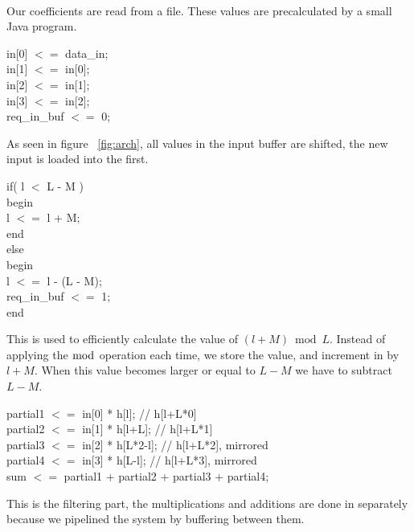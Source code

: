 \\
Our coefficients are read from a file. These values are precalculated by a small Java program.\\
\begin{center}
\parbox{10cm}{
in[0] $<=$ data\_in;\\
in[1] $<=$ in[0];\\
in[2] $<=$ in[1];\\
in[3] $<=$ in[2];\\
req\_in\_buf $<=$ 0;\\
}
\end{center}
As seen in figure ~\ref{fig:arch}, all values in the input buffer are shifted, the new input is loaded into the first.\\
\begin{center}
\parbox{10cm}{
if( l $<$ L - M )\\
begin\\
\phantom{xxxx} l $<=$ l + M;\\
end\\
else\\
begin\\
\phantom{xxxx}l $<=$ l - (L - M);\\
\phantom{xxxx}req\_in\_buf $<=$ 1;\\
end\\
}
\end{center}
This is used to efficiently calculate the value of $(l + M) \bmod L$. Instead of applying the $\bmod$ operation each time, we store the value, and increment in by $l + M$. When this value becomes larger or equal to  $L - M$ we have to subtract $L - M$.\\
\begin{center}
\parbox{10cm}{
partial1 $<=$ in[0] * h[l];      // h[l+L*0] \\
partial2 $<=$ in[1] * h[l+L];    // h[l+L*1]\\
partial3 $<=$ in[2] * h[L*2-l];  // h[l+L*2], mirrored\\
partial4 $<=$ in[3] * h[L-l];    // h[l+L*3], mirrored\\
sum $<=$ partial1 + partial2 + partial3 + partial4;\\
}
\end{center}
This is the filtering part, the multiplications and additions are done in separately because we pipelined the system by buffering between them.

\centerline{}
